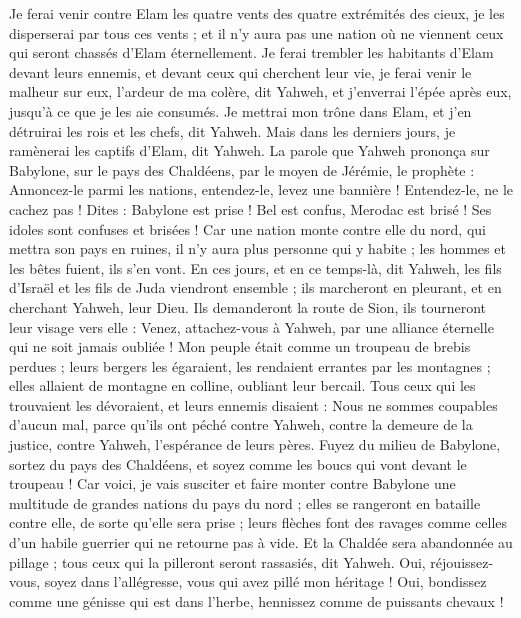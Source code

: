 \begin{multicols}{2}
Je ferai venir contre Elam les quatre vents des quatre extrémités des cieux, je les disperserai par tous ces vents ; et il n'y aura pas une nation où ne viennent ceux qui seront chassés d'Elam éternellement.
Je ferai trembler les habitants d'Elam devant leurs ennemis, et devant ceux qui cherchent leur vie, je ferai venir le malheur sur eux, l'ardeur de ma colère, dit Yahweh, et j'enverrai l'épée après eux, jusqu’à ce que je les aie consumés.
Je mettrai mon trône dans Elam, et j'en détruirai les rois et les chefs, dit Yahweh.
Mais dans les derniers jours, je ramènerai les captifs d'Elam, dit Yahweh.
\VerseOne{}La parole que Yahweh prononça sur Babylone, sur le pays des Chaldéens, par le moyen de Jérémie, le prophète :
Annoncez-le parmi les nations, entendez-le, levez une bannière ! Entendez-le, ne le cachez pas ! Dites : Babylone est prise ! Bel est confus, Merodac est brisé ! Ses idoles sont confuses et brisées !
Car une nation monte contre elle du nord, qui mettra son pays en ruines, il n'y aura plus personne qui y habite ; les hommes et les bêtes fuient, ils s'en vont.
En ces jours, et en ce temps-là, dit Yahweh, les fils d'Israël et les fils de Juda viendront ensemble ; ils marcheront en pleurant, et en cherchant Yahweh, leur Dieu.
Ils demanderont la route de Sion, ils tourneront leur visage vers elle : Venez, attachez-vous à Yahweh, par une alliance éternelle qui ne soit jamais oubliée !
Mon peuple était comme un troupeau de brebis perdues ; leurs bergers les égaraient, les rendaient errantes par les montagnes ; elles allaient de montagne en colline, oubliant leur bercail.
Tous ceux qui les trouvaient les dévoraient, et leurs ennemis disaient : Nous ne sommes coupables d'aucun mal, parce qu'ils ont péché contre Yahweh, contre la demeure de la justice, contre Yahweh, l'espérance de leurs pères.
Fuyez du milieu de Babylone, sortez du pays des Chaldéens, et soyez comme les boucs qui vont devant le troupeau !
Car voici, je vais susciter et faire monter contre Babylone une multitude de grandes nations du pays du nord ; elles se rangeront en bataille contre elle, de sorte qu'elle sera prise ; leurs flèches font des ravages comme celles d'un habile guerrier qui ne retourne pas à vide.
Et la Chaldée sera abandonnée au pillage ; tous ceux qui la pilleront seront rassasiés, dit Yahweh.
Oui, réjouissez-vous, soyez dans l'allégresse, vous qui avez pillé mon héritage ! Oui, bondissez comme une génisse qui est dans l'herbe, hennissez comme de puissants chevaux !

\end{multicols}
